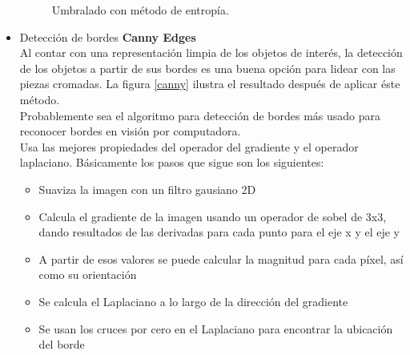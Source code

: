 \documentclass[a4paper, 11pt]{article}
\begin{document}
\begin{itemize}
  \begin{figure}[ht]%
    \centering
    \qquad
    \caption{Umbralado con método de entropía.}%
    \label{entropia}%
  \end{figure}

\item Detección de bordes \textbf{Canny Edges}\\

  Al contar con una representación limpia de los objetos de interés, la detección de los objetos a partir de sus bordes es una buena opción para lidear con las piezas cromadas. La figura \ref{canny} ilustra el resultado después de aplicar éste método.\\

  Probablemente sea el algoritmo para detección de bordes más usado para reconocer bordes en visión por computadora.\\

  Usa las mejores propiedades del operador del gradiente y el operador laplaciano. Básicamente los pasos que sigue son los siguientes:

  \begin{itemize}
  \item Suaviza la imagen con un filtro gausiano 2D
  \item Calcula el gradiente de la imagen usando un operador de sobel de 3x3, dando resultados de las derivadas para cada punto para el eje x y el eje y
  \item A partir de esos valores se puede calcular la magnitud para cada píxel, así como su orientación
  \item Se calcula el Laplaciano a lo largo de la dirección del gradiente
  \item Se usan los cruces por cero en el Laplaciano para encontrar la ubicación del borde
  \end{itemize}
  

\end{itemize}
\end{document}
